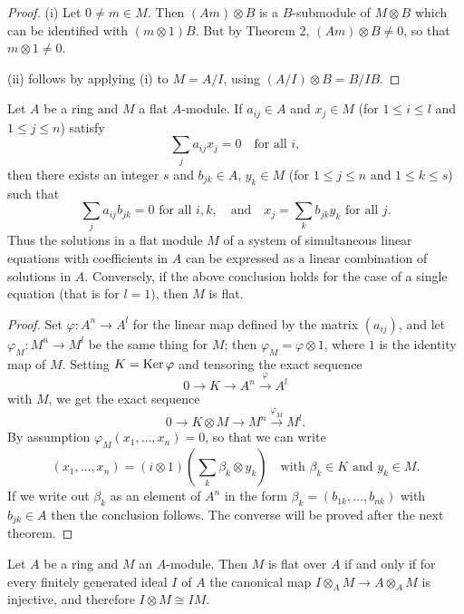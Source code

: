 \begin{proof}
(i) Let $0 \neq m \in M$. Then $(Am) \otimes B$ is a $B$-submodule of $M \otimes B$ which
can be identified with $(m \otimes 1)B$. But by Theorem 2, $(Am) \otimes B \neq 0$, so that
$m \otimes 1 \neq 0$.

(ii) follows by applying (i) to $M = A/I$, using $(A/I) \otimes B = B/IB$.
\end{proof}

\begin{theorem}\label{thm:7.6}
Let $A$ be a ring and $M$ a flat $A$-module. If $a_{ij} \in A$ and $x_j \in M$
(for $1 \le i \le l$ and $1 \le j \le n$) satisfy
\[
  \sum_j a_{ij}x_j = 0 \quad \text{for all } i,
\]
then there exists an integer $s$ and $b_{jk} \in A$, $y_k \in M$ (for $1 \le j \le n$ and $1 \le k \le s$)
such that
\[
  \sum_j a_{ij}b_{jk} = 0 \text{ for all } i, k, \quad \text{and} \quad x_j = \sum_k b_{jk}y_k \text{ for all } j.
\]
Thus the solutions in a flat module $M$ of a system of simultaneous linear
equations with coefficients in $A$ can be expressed as a linear combination of
solutions in $A$. Conversely, if the above conclusion holds for the case of a
single equation (that is for $l = 1$), then $M$ is flat.
\end{theorem}

\begin{proof}
Set $\varphi\colon A^n \to A^l$ for the linear map defined by the matrix $(a_{ij})$, and
let $\varphi_M\colon M^n \to M^l$ be the same thing for $M$; then $\varphi_M = \varphi \otimes 1$, where $1$ is
the identity map of $M$. Setting $K = \operatorname{Ker} \varphi$ and tensoring the exact sequence
\[
  0 \to K \to A^n \xrightarrow{\varphi} A^l
\]
with $M$, we get the exact sequence
\[
  0 \to K \otimes M \to M^n \xrightarrow{\varphi_M} M^l.
\]
By assumption $\varphi_M(x_1, \ldots, x_n) = 0$, so that we can write
\[
  (x_1, \ldots, x_n) = (i \otimes 1)\left(\sum_k \beta_k \otimes y_k\right) \quad \text{with } \beta_k \in K \text{ and } y_k \in M.
\]
If we write out $\beta_k$ as an element of $A^n$ in the form $\beta_k = (b_{1k}, \ldots, b_{nk})$ with
$b_{jk} \in A$ then the conclusion follows. The converse will be proved after the
next theorem.
\end{proof}

\begin{theorem}\label{thm:7.7}
Let $A$ be a ring and $M$ an $A$-module. Then $M$ is flat over $A$ if
and only if for every finitely generated ideal $I$ of $A$ the canonical map
$I \otimes_A M \to A \otimes_A M$ is injective, and therefore $I \otimes M \cong IM$.
\end{theorem}

